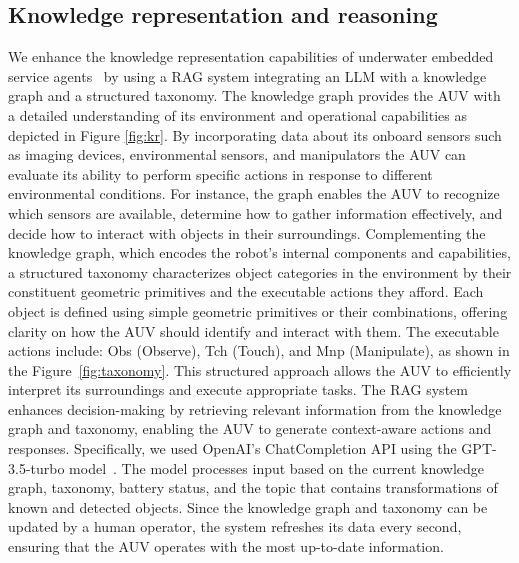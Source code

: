 \documentclass[journal]{IEEEtran}
\begin{document}
\subsection{Knowledge representation and reasoning}  
We enhance the knowledge representation capabilities of underwater embedded service agents~\cite{patron2009situation,patron2011embedded} by using a RAG system integrating an LLM with a knowledge graph and a structured taxonomy. The knowledge graph provides the AUV with a detailed understanding of its environment and operational capabilities as depicted in Figure \ref{fig:kr}. By incorporating data about its onboard sensors such as imaging devices, environmental sensors, and manipulators the AUV can evaluate its ability to perform specific actions in response to different environmental conditions. For instance, the graph enables the AUV to recognize which sensors are available, determine how to gather information effectively, and decide how to interact with objects in their surroundings.  
Complementing the knowledge graph, which encodes the robot’s internal components and capabilities, a structured taxonomy characterizes object categories in the environment by their constituent geometric primitives and the executable actions they afford. Each object is defined using simple geometric primitives or their combinations, offering clarity on how the AUV should identify and interact with them. The executable actions include: Obs (Observe), Tch (Touch), and Mnp (Manipulate), as shown in the Figure~\ref{fig:taxonomy}.
This structured approach allows the AUV to efficiently interpret its surroundings and execute appropriate tasks. The RAG system enhances decision-making by retrieving relevant information from the knowledge graph and taxonomy, enabling the AUV to generate context-aware actions and responses. Specifically, we used OpenAI's ChatCompletion API using the GPT-3.5-turbo model~\cite{OpenAI2024}. The model processes input based on the current knowledge graph, taxonomy, battery status, and the topic that contains transformations of known and detected objects. Since the knowledge graph and taxonomy can be updated by a human operator, the system refreshes its data every second, ensuring that the AUV operates with the most up-to-date information.
\end{document}
